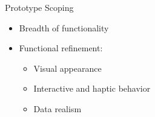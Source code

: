 \begin{Slide}{Prototype Scoping}

\begin{itemize}
\item Breadth of functionality
\item Functional refinement:
\begin{itemize}
\item Visual appearance
\item Interactive and haptic behavior
\item Data realism

\end{itemize}
\end{itemize}
\end{Slide}